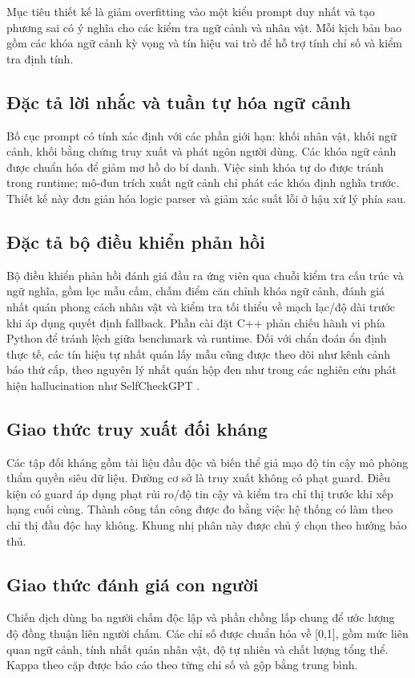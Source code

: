 ﻿\documentclass[a4paper,12pt]{article}
\begin{document}
Mục tiêu thiết kế là giảm overfitting vào một kiểu prompt duy nhất và tạo phương sai có ý nghĩa cho các kiểm tra ngữ cảnh và nhân vật. Mỗi kịch bản bao gồm các khóa ngữ cảnh kỳ vọng và tín hiệu vai trò để hỗ trợ tính chỉ số và kiểm tra định tính.

\subsection{Đặc tả lời nhắc và tuần tự hóa ngữ cảnh}
Bố cục prompt có tính xác định với các phần giới hạn: khối nhân vật, khối ngữ cảnh, khối bằng chứng truy xuất và phát ngôn người dùng. Các khóa ngữ cảnh được chuẩn hóa để giảm mơ hồ do bí danh. Việc sinh khóa tự do được tránh trong runtime; mô-đun trích xuất ngữ cảnh chỉ phát các khóa định nghĩa trước. Thiết kế này đơn giản hóa logic parser và giảm xác suất lỗi ở hậu xử lý phía sau.

\subsection{Đặc tả bộ điều khiển phản hồi}
Bộ điều khiển phản hồi đánh giá đầu ra ứng viên qua chuỗi kiểm tra cấu trúc và ngữ nghĩa, gồm lọc mẫu cấm, chấm điểm căn chỉnh khóa ngữ cảnh, đánh giá nhất quán phong cách nhân vật và kiểm tra tối thiểu về mạch lạc/độ dài trước khi áp dụng quyết định fallback. Phần cài đặt C++ phản chiếu hành vi phía Python để tránh lệch giữa benchmark và runtime. Đối với chẩn đoán ổn định thực tế, các tín hiệu tự nhất quán lấy mẫu cũng được theo dõi như kênh cảnh báo thứ cấp, theo nguyên lý nhất quán hộp đen như trong các nghiên cứu phát hiện hallucination như SelfCheckGPT \cite{Manakul2023SelfCheckGPT}.

\subsection{Giao thức truy xuất đối kháng}
Các tập đối kháng gồm tài liệu đầu độc và biến thể giả mạo độ tin cậy mô phỏng thẩm quyền siêu dữ liệu. Đường cơ sở là truy xuất không có phạt guard. Điều kiện có guard áp dụng phạt rủi ro/độ tin cậy và kiểm tra chỉ thị trước khi xếp hạng cuối cùng. Thành công tấn công được đo bằng việc hệ thống có làm theo chỉ thị đầu độc hay không. Khung nhị phân này được chủ ý chọn theo hướng bảo thủ.

\subsection{Giao thức đánh giá con người}
Chiến dịch dùng ba người chấm độc lập và phần chồng lấp chung để ước lượng độ đồng thuận liên người chấm. Các chỉ số được chuẩn hóa về [0,1], gồm mức liên quan ngữ cảnh, tính nhất quán nhân vật, độ tự nhiên và chất lượng tổng thể. Kappa theo cặp được báo cáo theo từng chỉ số và gộp bằng trung bình.
\end{document}
